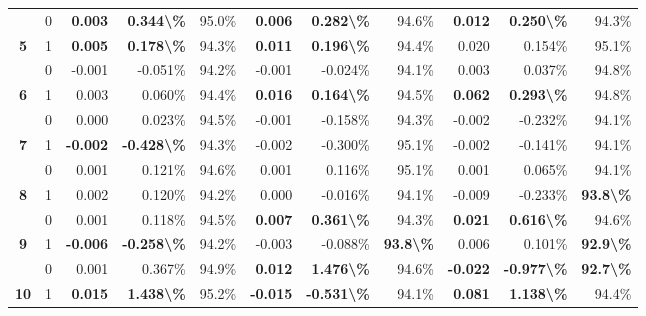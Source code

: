 \begin{table}
\begin{tabular}[t]{>{}ccrrrrrrrrr}
 & 0 & \textbf{ 0.003} & \textbf{ 0.344\textbackslash{}\%} & 95.0\% & \textbf{ 0.006} & \textbf{ 0.282\textbackslash{}\%} & 94.6\% & \textbf{ 0.012} & \textbf{ 0.250\textbackslash{}\%} & 94.3\%\\

\multirow[t]{-2}{*}{\centering\arraybackslash \textbf{5}} & 1 & \textbf{ 0.005} & \textbf{ 0.178\textbackslash{}\%} & 94.3\% & \textbf{ 0.011} & \textbf{ 0.196\textbackslash{}\%} & 94.4\% & 0.020 & 0.154\% & 95.1\%\\

 & 0 & -0.001 & -0.051\% & 94.2\% & -0.001 & -0.024\% & 94.1\% & 0.003 & 0.037\% & 94.8\%\\

\multirow[t]{-2}{*}{\centering\arraybackslash \textbf{6}} & 1 & 0.003 & 0.060\% & 94.4\% & \textbf{ 0.016} & \textbf{ 0.164\textbackslash{}\%} & 94.5\% & \textbf{ 0.062} & \textbf{ 0.293\textbackslash{}\%} & 94.8\%\\

\rule{0pt}{4ex}
 & 0 & 0.000 & 0.023\% & 94.5\% & -0.001 & -0.158\% & 94.3\% & -0.002 & -0.232\% & 94.1\%\\

\multirow[t]{-2}{*}{\centering\arraybackslash \textbf{7}} & 1 & \textbf{-0.002} & \textbf{-0.428\textbackslash{}\%} & 94.3\% & -0.002 & -0.300\% & 95.1\% & -0.002 & -0.141\% & 94.1\%\\

 & 0 & 0.001 & 0.121\% & 94.6\% & 0.001 & 0.116\% & 95.1\% & 0.001 & 0.065\% & 94.1\%\\

\multirow[t]{-2}{*}{\centering\arraybackslash \textbf{8}} & 1 & 0.002 & 0.120\% & 94.2\% & 0.000 & -0.016\% & 94.1\% & -0.009 & -0.233\% & \textbf{93.8\textbackslash{}\%}\\

 & 0 & 0.001 & 0.118\% & 94.5\% & \textbf{ 0.007} & \textbf{ 0.361\textbackslash{}\%} & 94.3\% & \textbf{ 0.021} & \textbf{ 0.616\textbackslash{}\%} & 94.6\%\\

\multirow[t]{-2}{*}{\centering\arraybackslash \textbf{9}} & 1 & \textbf{-0.006} & \textbf{-0.258\textbackslash{}\%} & 94.2\% & -0.003 & -0.088\% & \textbf{93.8\textbackslash{}\%} & 0.006 & 0.101\% & \textbf{92.9\textbackslash{}\%}\\

\rule{0pt}{4ex}
 & 0 & 0.001 & 0.367\% & 94.9\% & \textbf{ 0.012} & \textbf{ 1.476\textbackslash{}\%} & 94.6\% & \textbf{-0.022} & \textbf{-0.977\textbackslash{}\%} & \textbf{92.7\textbackslash{}\%}\\

\multirow[t]{-2}{*}{\centering\arraybackslash \textbf{10}} & 1 & \textbf{ 0.015} & \textbf{ 1.438\textbackslash{}\%} & 95.2\% & \textbf{-0.015} & \textbf{-0.531\textbackslash{}\%} & 94.1\% & \textbf{ 0.081} & \textbf{ 1.138\textbackslash{}\%} & 94.4\%\\
\bottomrule
\end{tabular}
\end{table}
